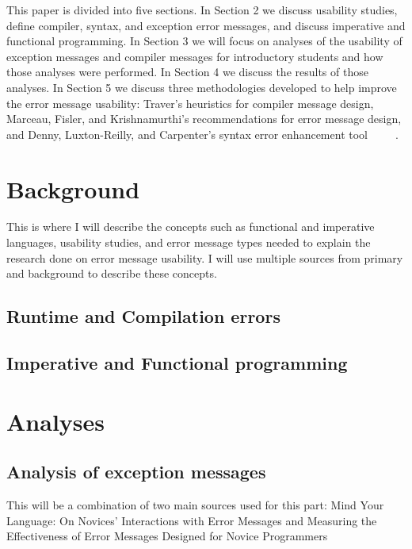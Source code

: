 \documentclass{sig-alternate}
\begin{document}
This paper is divided into five sections. In Section 2 we discuss usability studies, define compiler, syntax, and exception error messages, and discuss imperative and functional programming. In Section 3 we will focus on  analyses of the usability of exception messages and compiler messages for introductory students and how those analyses were performed. In Section 4 we discuss the results of those analyses. In Section 5 we discuss three methodologies developed to help improve the error message usability: Traver's heuristics for compiler message design, Marceau, Fisler, and Krishnamurthi's recommendations for error message design, and Denny, Luxton-Reilly, and Carpenter's syntax error enhancement tool ~\cite{Traver:2010} ~\cite{Marceau:2011:MYL:2048237.2048241} ~\cite{Denny:2014:ESE:2591708.2591748}.



\section{Background}\label{background}
This is where I will describe the concepts such as functional and imperative languages, usability studies, and error message types needed to explain the research done on error message usability. I will use multiple sources from primary and background to describe these concepts. 


\subsection{Runtime and Compilation errors}

\subsection{Imperative and Functional programming}

\section{Analyses}\label{analyses}



\subsection{Analysis of exception messages}
This will be a combination of two main sources used for this part: Mind Your Language: On Novices' Interactions with Error Messages and Measuring the Effectiveness of Error Messages Designed for Novice Programmers
\end{document}
